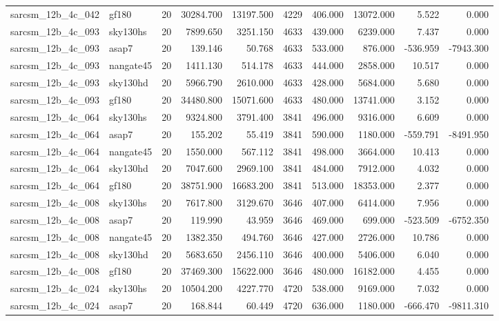 \documentclass{article}
\begin{document}
\begin{longtable}{llrrrrrrrr}
sarcsm\_12b\_4c\_042 & gf180 & 20 & 30284.700 & 13197.500 & 4229 & 406.000 & 13072.000 & 5.522 & 0.000 \\
sarcsm\_12b\_4c\_093 & sky130hs & 20 & 7899.650 & 3251.150 & 4633 & 439.000 & 6239.000 & 7.437 & 0.000 \\
sarcsm\_12b\_4c\_093 & asap7 & 20 & 139.146 & 50.768 & 4633 & 533.000 & 876.000 & -536.959 & -7943.300 \\
sarcsm\_12b\_4c\_093 & nangate45 & 20 & 1411.130 & 514.178 & 4633 & 444.000 & 2858.000 & 10.517 & 0.000 \\
sarcsm\_12b\_4c\_093 & sky130hd & 20 & 5966.790 & 2610.000 & 4633 & 428.000 & 5684.000 & 5.680 & 0.000 \\
sarcsm\_12b\_4c\_093 & gf180 & 20 & 34480.800 & 15071.600 & 4633 & 480.000 & 13741.000 & 3.152 & 0.000 \\
sarcsm\_12b\_4c\_064 & sky130hs & 20 & 9324.800 & 3791.400 & 3841 & 496.000 & 9316.000 & 6.609 & 0.000 \\
sarcsm\_12b\_4c\_064 & asap7 & 20 & 155.202 & 55.419 & 3841 & 590.000 & 1180.000 & -559.791 & -8491.950 \\
sarcsm\_12b\_4c\_064 & nangate45 & 20 & 1550.000 & 567.112 & 3841 & 498.000 & 3664.000 & 10.413 & 0.000 \\
sarcsm\_12b\_4c\_064 & sky130hd & 20 & 7047.600 & 2969.100 & 3841 & 484.000 & 7912.000 & 4.032 & 0.000 \\
sarcsm\_12b\_4c\_064 & gf180 & 20 & 38751.900 & 16683.200 & 3841 & 513.000 & 18353.000 & 2.377 & 0.000 \\
sarcsm\_12b\_4c\_008 & sky130hs & 20 & 7617.800 & 3129.670 & 3646 & 407.000 & 6414.000 & 7.956 & 0.000 \\
sarcsm\_12b\_4c\_008 & asap7 & 20 & 119.990 & 43.959 & 3646 & 469.000 & 699.000 & -523.509 & -6752.350 \\
sarcsm\_12b\_4c\_008 & nangate45 & 20 & 1382.350 & 494.760 & 3646 & 427.000 & 2726.000 & 10.786 & 0.000 \\
sarcsm\_12b\_4c\_008 & sky130hd & 20 & 5683.650 & 2456.110 & 3646 & 400.000 & 5406.000 & 6.040 & 0.000 \\
sarcsm\_12b\_4c\_008 & gf180 & 20 & 37469.300 & 15622.000 & 3646 & 480.000 & 16182.000 & 4.455 & 0.000 \\
sarcsm\_12b\_4c\_024 & sky130hs & 20 & 10504.200 & 4227.770 & 4720 & 538.000 & 9169.000 & 7.032 & 0.000 \\
sarcsm\_12b\_4c\_024 & asap7 & 20 & 168.844 & 60.449 & 4720 & 636.000 & 1180.000 & -666.470 & -9811.310 \\

\end{longtable}
\end{document}
